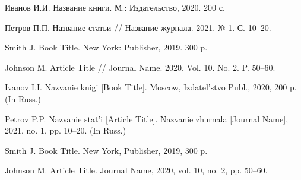 \documentclass[12pt]{article}
\begin{document}

\bibliosectioncyrillic
\begin{bibliolistnum}
\item Иванов И.И. Название книги. М.: Издательство, 2020. 200 с.
\item Петров П.П. Название статьи // Название журнала. 2021. № 1. С. 10--20.
\end{bibliolistnum}

\bibliosectionlatin
\begin{bibliolistnum}
\item Smith J. Book Title. New York: Publisher, 2019. 300 p.
\item Johnson M. Article Title // Journal Name. 2020. Vol. 10. No. 2. P. 50--60.
\end{bibliolistnum}

%
%




\begin{bibliolistnum}
\item Ivanov I.I. Nazvanie knigi [Book Title]. Moscow, Izdatel'stvo Publ., 2020, 200 p. (In Russ.)
\item Petrov P.P. Nazvanie stat'i [Article Title]. Nazvanie zhurnala [Journal Name], 2021, no. 1, pp. 10--20. (In Russ.)
\item Smith J. Book Title. New York, Publisher, 2019, 300 p.
\item Johnson M. Article Title. Journal Name, 2020, vol. 10, no. 2, pp. 50--60.
\end{bibliolistnum}
\end{document}
